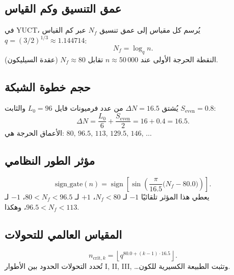 \documentclass[12pt,a4paper]{article}
\newcommand{\Seven}{S_{\mathrm{even}}}
\begin{document}
	\subsection{عمق التنسيق وكم القياس}
	في YUCT، يُرسم كل مقياس إلى عمق تنسيق \(N_f\) عبر كم القياس \(q = (3/2)^{1/3} \approx 1.144714\):
	\[
	N_f = \log_q n.
	\]
	النقطة الحرجة الأولى عند \(n \approx 50\,000\) تقابل \(N_f \approx 80\) (عقدة السيليكون).
	
	\subsection{حجم خطوة الشبكة}
	يُشتق \(\Delta N = 16.5\) من عدد فرميونات فايل \(L_0 = 96\) والثابت \(\Seven = 0.8\):
	\[
	\Delta N = \frac{L_0}{6} + \frac{\Seven}{2} = 16 + 0.4 = 16.5.
	\]
	الأعماق الحرجة هي: \(80,\,96.5,\,113,\,129.5,\,146,\,\dots\)
	
	\subsection{مؤثر الطور النظامي}
	\begin{equation}
		\boxed{\mathrm{sign\_gate}(n) = \operatorname{sign}\!\left[\sin\!\left(\frac{\pi}{16.5}\bigl(N_f - 80.0\bigr)\right)\right]}.
	\end{equation}
	يعطي هذا المؤثر تلقائيًا $-1$ لـ \(N_f<80\)، $+1$ لـ \(80<N_f<96.5\)، $-1$ لـ \(96.5<N_f<113\)، وهكذا.
	
	\subsection{المقياس العالمي للتحولات}
	\[
	n_{\mathrm{crit},k} = \left\lfloor q^{80.0 + (k-1)\cdot 16.5} \right\rfloor.
	\]
	تُحدد التحولات الحدود بين الأطوار I, II, III, \dots وتثبت الطبيعة الكسيرية للكون.
	
\end{document}
